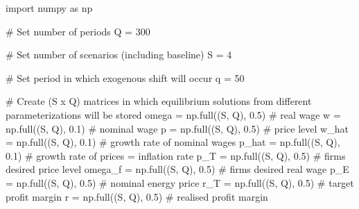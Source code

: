 \documentclass[
  letterpaper,
  DIV=11,
  numbers=noendperiod]{scrreprt}
\newenvironment{Shaded}{\begin{snugshade}}{\end{snugshade}}
\newcommand{\CommentTok}[1]{\textcolor[rgb]{0.37,0.37,0.37}{#1}}
\newcommand{\DecValTok}[1]{\textcolor[rgb]{0.68,0.00,0.00}{#1}}
\newcommand{\FloatTok}[1]{\textcolor[rgb]{0.68,0.00,0.00}{#1}}
\newcommand{\ImportTok}[1]{\textcolor[rgb]{0.00,0.46,0.62}{#1}}
\newcommand{\NormalTok}[1]{\textcolor[rgb]{0.00,0.23,0.31}{#1}}
\newcommand{\OperatorTok}[1]{\textcolor[rgb]{0.37,0.37,0.37}{#1}}
\begin{document}
\begin{tcolorbox}[enhanced jigsaw, titlerule=0mm, breakable, bottomrule=.15mm, toprule=.15mm, colbacktitle=quarto-callout-note-color!10!white, rightrule=.15mm, toptitle=1mm, opacityback=0, left=2mm, coltitle=black, title=\textcolor{quarto-callout-note-color}{\faInfo}\hspace{0.5em}{Python code}, colframe=quarto-callout-note-color-frame, opacitybacktitle=0.6, leftrule=.75mm, bottomtitle=1mm, arc=.35mm, colback=white]

\begin{Shaded}
\begin{Highlighting}[]
\ImportTok{import}\NormalTok{ numpy }\ImportTok{as}\NormalTok{ np}

\CommentTok{\# Set number of periods}
\NormalTok{Q }\OperatorTok{=} \DecValTok{300}

\CommentTok{\# Set number of scenarios (including baseline)}
\NormalTok{S }\OperatorTok{=} \DecValTok{4}

\CommentTok{\# Set period in which exogenous shift will occur}
\NormalTok{q }\OperatorTok{=} \DecValTok{50}

\CommentTok{\# Create (S x Q) matrices in which equilibrium solutions from different parameterizations will be stored}
\NormalTok{omega }\OperatorTok{=}\NormalTok{ np.full((S, Q), }\FloatTok{0.5}\NormalTok{)  }\CommentTok{\# real wage}
\NormalTok{w }\OperatorTok{=}\NormalTok{ np.full((S, Q), }\FloatTok{0.1}\NormalTok{)      }\CommentTok{\# nominal wage}
\NormalTok{p }\OperatorTok{=}\NormalTok{ np.full((S, Q), }\FloatTok{0.5}\NormalTok{)      }\CommentTok{\# price level}
\NormalTok{w\_hat }\OperatorTok{=}\NormalTok{ np.full((S, Q), }\FloatTok{0.1}\NormalTok{)  }\CommentTok{\# growth rate of nominal wages}
\NormalTok{p\_hat }\OperatorTok{=}\NormalTok{ np.full((S, Q), }\FloatTok{0.1}\NormalTok{)  }\CommentTok{\# growth rate of prices = inflation rate}
\NormalTok{p\_T }\OperatorTok{=}\NormalTok{ np.full((S, Q), }\FloatTok{0.5}\NormalTok{)    }\CommentTok{\# firms\textquotesingle{} desired price level}
\NormalTok{omega\_f }\OperatorTok{=}\NormalTok{ np.full((S, Q), }\FloatTok{0.5}\NormalTok{) }\CommentTok{\# firms\textquotesingle{} desired real wage }
\NormalTok{p\_E }\OperatorTok{=}\NormalTok{ np.full((S, Q), }\FloatTok{0.5}\NormalTok{)  }\CommentTok{\# nominal energy price}
\NormalTok{r\_T }\OperatorTok{=}\NormalTok{ np.full((S, Q), }\FloatTok{0.5}\NormalTok{)    }\CommentTok{\# target profit margin}
\NormalTok{r }\OperatorTok{=}\NormalTok{ np.full((S, Q), }\FloatTok{0.5}\NormalTok{)      }\CommentTok{\# realised profit margin}


\end{Highlighting}
\end{Shaded}
\end{tcolorbox}
\end{document}
